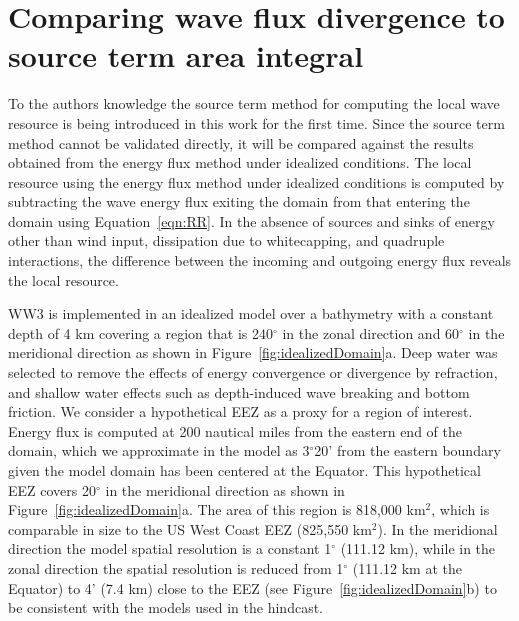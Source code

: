 \section{Comparing wave flux divergence to source term area integral}\label{appendix:flux-vs-area}

To the authors knowledge the source term method for computing the local wave resource is being introduced in this work for the first time. Since the source term method cannot be validated directly, it will be compared against the results obtained from the energy flux method under idealized conditions. The local resource using the energy flux method under idealized conditions is computed by subtracting the wave energy flux exiting the domain from that entering the domain using Equation~\eqref{eqn:RR}. In the absence of sources and sinks of energy other than wind input, dissipation due to whitecapping, and quadruple interactions, the difference between the incoming and outgoing energy flux reveals the local resource.

WW3 is implemented in an idealized model over a bathymetry with a constant depth of 4 km covering a region that is 240$^{\circ}$ in the zonal direction and 60$^{\circ}$ in the meridional direction as shown in Figure~\ref{fig:idealizedDomain}a. Deep water was selected to remove the effects of energy convergence or divergence by refraction, and shallow water effects such as depth-induced wave breaking and bottom friction. We consider a hypothetical EEZ as a proxy for a region of interest. Energy flux is computed at 200 nautical miles from the eastern end of the domain, which we approximate in the model as 3$^{\circ}$20’ from the eastern boundary given the model domain has been centered at the Equator. This hypothetical EEZ covers 20$^{\circ}$ in the meridional direction as shown in Figure~\ref{fig:idealizedDomain}a. The area of this region is 818,000 km$^{2}$, which is comparable in size to the US West Coast EEZ (825,550 km$^{2}$). In the meridional direction the model spatial resolution is a constant 1$^{\circ}$ (111.12 km), while in the zonal direction the spatial resolution is reduced from 1$^{\circ}$ (111.12 km at the Equator) to 4’ (7.4 km) close to the EEZ (see Figure~\ref{fig:idealizedDomain}b) to be consistent with the models used in the hindcast.
 
